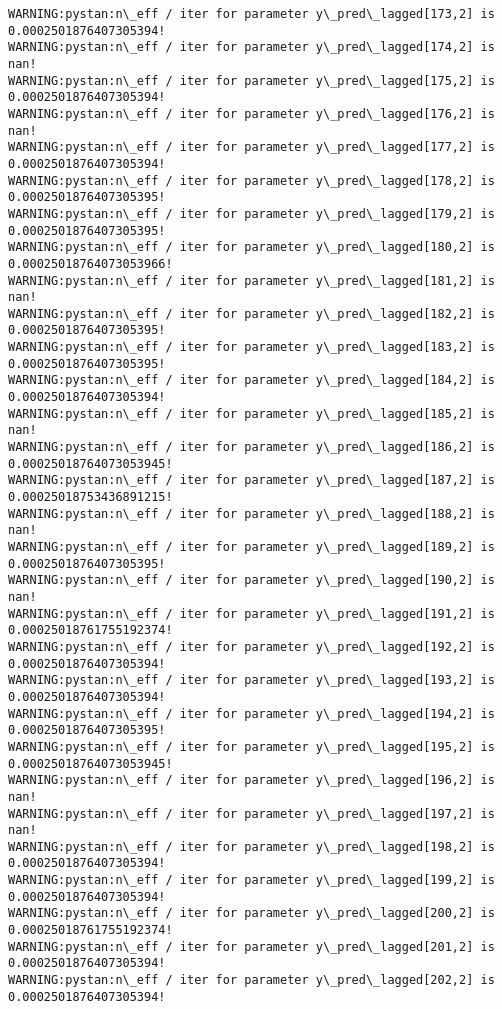 \documentclass[11pt]{article}
\begin{document}
\begin{Verbatim}[commandchars=\\\{\}]
WARNING:pystan:n\_eff / iter for parameter y\_pred\_lagged[173,2] is 0.0002501876407305394!
WARNING:pystan:n\_eff / iter for parameter y\_pred\_lagged[174,2] is nan!
WARNING:pystan:n\_eff / iter for parameter y\_pred\_lagged[175,2] is 0.0002501876407305394!
WARNING:pystan:n\_eff / iter for parameter y\_pred\_lagged[176,2] is nan!
WARNING:pystan:n\_eff / iter for parameter y\_pred\_lagged[177,2] is 0.0002501876407305394!
WARNING:pystan:n\_eff / iter for parameter y\_pred\_lagged[178,2] is 0.0002501876407305395!
WARNING:pystan:n\_eff / iter for parameter y\_pred\_lagged[179,2] is 0.0002501876407305395!
WARNING:pystan:n\_eff / iter for parameter y\_pred\_lagged[180,2] is 0.00025018764073053966!
WARNING:pystan:n\_eff / iter for parameter y\_pred\_lagged[181,2] is nan!
WARNING:pystan:n\_eff / iter for parameter y\_pred\_lagged[182,2] is 0.0002501876407305395!
WARNING:pystan:n\_eff / iter for parameter y\_pred\_lagged[183,2] is 0.0002501876407305395!
WARNING:pystan:n\_eff / iter for parameter y\_pred\_lagged[184,2] is 0.0002501876407305394!
WARNING:pystan:n\_eff / iter for parameter y\_pred\_lagged[185,2] is nan!
WARNING:pystan:n\_eff / iter for parameter y\_pred\_lagged[186,2] is 0.00025018764073053945!
WARNING:pystan:n\_eff / iter for parameter y\_pred\_lagged[187,2] is 0.00025018753436891215!
WARNING:pystan:n\_eff / iter for parameter y\_pred\_lagged[188,2] is nan!
WARNING:pystan:n\_eff / iter for parameter y\_pred\_lagged[189,2] is 0.0002501876407305395!
WARNING:pystan:n\_eff / iter for parameter y\_pred\_lagged[190,2] is nan!
WARNING:pystan:n\_eff / iter for parameter y\_pred\_lagged[191,2] is 0.00025018761755192374!
WARNING:pystan:n\_eff / iter for parameter y\_pred\_lagged[192,2] is 0.0002501876407305394!
WARNING:pystan:n\_eff / iter for parameter y\_pred\_lagged[193,2] is 0.0002501876407305394!
WARNING:pystan:n\_eff / iter for parameter y\_pred\_lagged[194,2] is 0.0002501876407305395!
WARNING:pystan:n\_eff / iter for parameter y\_pred\_lagged[195,2] is 0.00025018764073053945!
WARNING:pystan:n\_eff / iter for parameter y\_pred\_lagged[196,2] is nan!
WARNING:pystan:n\_eff / iter for parameter y\_pred\_lagged[197,2] is nan!
WARNING:pystan:n\_eff / iter for parameter y\_pred\_lagged[198,2] is 0.0002501876407305394!
WARNING:pystan:n\_eff / iter for parameter y\_pred\_lagged[199,2] is 0.0002501876407305394!
WARNING:pystan:n\_eff / iter for parameter y\_pred\_lagged[200,2] is 0.00025018761755192374!
WARNING:pystan:n\_eff / iter for parameter y\_pred\_lagged[201,2] is 0.0002501876407305394!
WARNING:pystan:n\_eff / iter for parameter y\_pred\_lagged[202,2] is 0.0002501876407305394!

\end{Verbatim}
\end{document}
